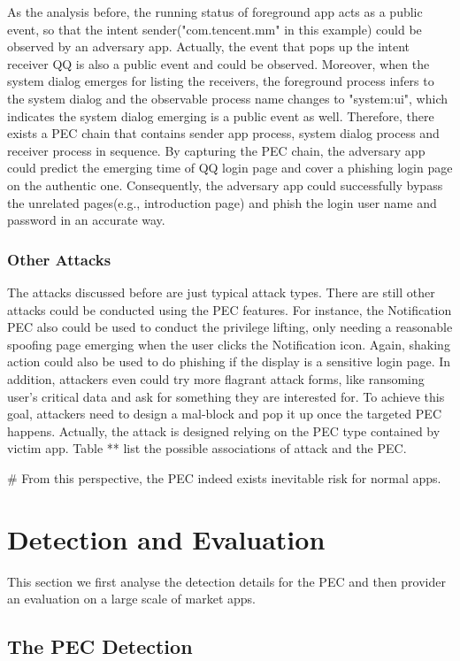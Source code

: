\documentclass{sig-alternate-05-2015}
\begin{document}
As the analysis before, the running status of foreground app acts as a public event, so that the intent sender("com.tencent.mm" in this example) could be observed by an adversary app. Actually, the event that pops up the intent receiver QQ is also a public event and could be observed. Moreover, when the system dialog emerges for listing the receivers, the foreground process infers to the system dialog and the observable process name changes to "system:ui", which indicates the system dialog emerging is a public event as well. Therefore, there exists a PEC chain that contains sender app process, system dialog process and receiver process in sequence. By capturing the PEC chain, the adversary app could predict the emerging time of QQ login page and cover a phishing login page on the authentic one. Consequently, the adversary app could successfully bypass the unrelated pages(e.g., introduction page) and phish the login user name and password in an accurate way.

\subsubsection{Other Attacks}
The attacks discussed before are just typical attack types. There are still other attacks could be conducted using the PEC features. For instance, the Notification PEC also could be used to conduct the privilege lifting, only needing a reasonable spoofing page emerging when the user clicks the Notification icon. Again, shaking action could also be used to do phishing if the display is a sensitive login page. In addition, attackers even could try more flagrant attack forms, like ransoming user's critical data and ask for something they are interested for. To achieve this goal, attackers need to design a mal-block and pop it up once the targeted PEC happens. Actually, the attack is designed relying on the PEC type contained by victim app. Table ** list the possible associations of attack and the PEC.

\# From this perspective, the PEC indeed exists inevitable risk for normal apps.


\section{Detection and Evaluation}
This section we first analyse the detection details for the PEC and then provider an evaluation on a large scale of market apps.
\subsection{The PEC Detection}
\end{document}
